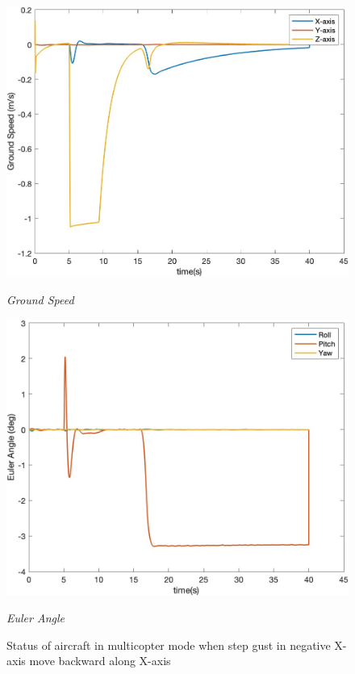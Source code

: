 \begin{figure}[htbp]
\begin{minipage}[b]{0.45\textwidth}
    \centering
    \includegraphics[width=\textwidth]{Images/Gust/VTOL step/3 groundspeed_1.jpg}
    \caption*{\textit{Ground Speed}}
  \end{minipage}
  \hfil
  \begin{minipage}[b]{0.45\textwidth}
    \centering
    \includegraphics[width=\textwidth]{Images/Gust/VTOL step/4 EulerAngle_1.jpg}
    \caption*{\textit{Euler Angle}}
  \end{minipage}
  \caption{Status of aircraft in multicopter mode when step gust in negative X-axis move backward along X-axis}
  \label{fig:VTOL step -x}
\end{figure}

